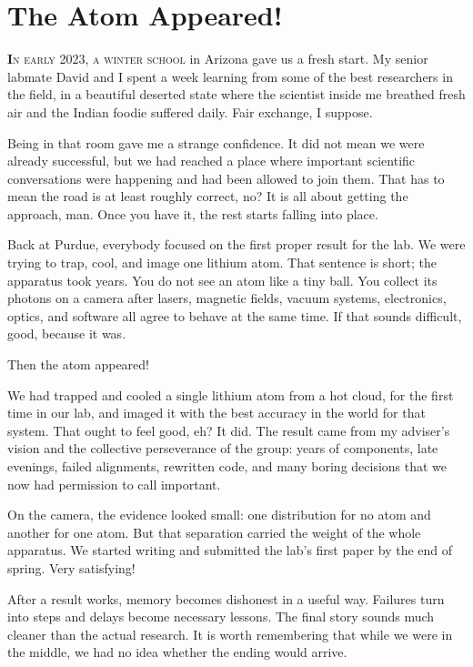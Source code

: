 \documentclass[11pt,twoside,openany]{book}
\newcommand{\dropcap}[2]{\lettrine[lines=3,findent=2pt,nindent=4pt]{\color{accent}\textsf{\textbf{#1}}}{#2}}
\newcommand{\scene}{\par\vspace{0.7em}{\centering\color{accent}\rule{0.85cm}{0.6pt}\par}\vspace{0.5em}\noindent\ignorespaces}
\begin{document}
\chapter{The Atom Appeared!}

\dropcap{I}{n early 2023, a winter school} in Arizona gave us a fresh start.
My senior labmate David and I spent a week learning from some of the best
researchers in the field, in a beautiful deserted state where the scientist
inside me breathed fresh air and the Indian foodie suffered daily. Fair
exchange, I suppose.

Being in that room gave me a strange confidence. It did not mean we were
already successful, but we had reached a place where important scientific
conversations were happening and had been allowed to join them. That has to
mean the road is at least roughly correct, no? It is all about getting the
approach, man. Once you have it, the rest starts falling into place.

Back at Purdue, everybody focused on the first proper result for the lab. We
were trying to trap, cool, and image one lithium atom. That sentence is short;
the apparatus took years. You do not see an atom like a tiny ball. You collect
its photons on a camera after lasers, magnetic fields, vacuum systems,
electronics, optics, and software all agree to behave at the same time. If
that sounds difficult, good, because it was.

Then the atom appeared!

We had trapped and cooled a single lithium atom from a hot cloud, for the
first time in our lab, and imaged it with the best accuracy in the world for
that system. That ought to feel good, eh? It did. The result came from my
adviser's vision and the collective perseverance of the group: years of
components, late evenings, failed alignments, rewritten code, and many boring
decisions that we now had permission to call important.

On the camera, the evidence looked small: one distribution for no atom and
another for one atom. But that separation carried the weight of the whole
apparatus. We started writing and submitted the lab's first paper by the end
of spring. Very satisfying!

\scene

After a result works, memory becomes dishonest in a useful way. Failures turn
into steps and delays become necessary lessons. The final story sounds much
cleaner than the actual research. It is worth remembering that while we were
in the middle, we had no idea whether the ending would arrive.
\end{document}
